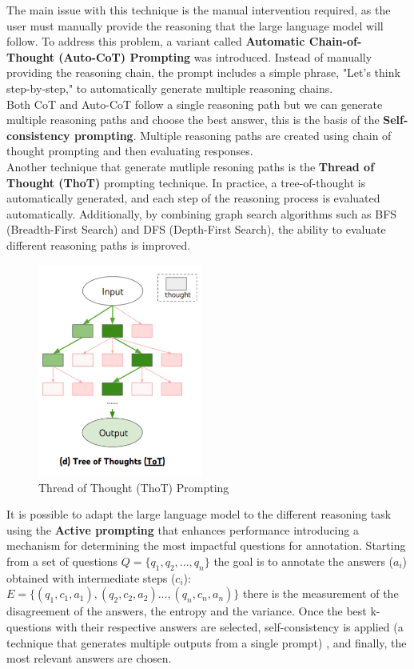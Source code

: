 The main issue with this technique is the manual intervention required, as the user must manually provide the reasoning that the large language model will follow. To address this problem, a variant called \textbf{Automatic Chain-of-Thought (Auto-CoT) Prompting} was introduced. Instead of manually providing the reasoning chain, the prompt includes a simple phrase, "Let's think step-by-step," to automatically generate multiple reasoning chains.\\
Both CoT and Auto-CoT follow a single reasoning path but we can generate multiple reasoning paths and choose the best answer, this is the basis of the \textbf{Self-consistency prompting}\cite{wang2022self}. Multiple reasoning paths are created using chain of thought prompting and then evaluating responses.\\
Another technique that generate mutliple resoning paths is the \textbf{Thread of Thought (ThoT)}
prompting technique. In practice, a tree-of-thought is automatically generated, and each step of the reasoning process is evaluated automatically. Additionally, by combining graph search algorithms such as BFS (Breadth-First Search) and DFS (Depth-First Search), the ability to evaluate different reasoning paths is improved.
\begin{figure}[H]
    \centering
    \includegraphics[width=0.4\linewidth, height=7cm]{Figures/fig_6.png}
    \caption{Thread of Thought (ThoT) Prompting}
    \label{fig:enter-label}
\end{figure}
It is possible to adapt the large language model to the different reasoning task using the \textbf{Active prompting} that enhances performance introducing a mechanism for determining the most impactful questions for annotation. Starting from a set of questions $Q = \{q_1, q_2, ..., q_n\}$ the goal is to annotate the answers ($a_i$) obtained with intermediate steps ($c_i$):\\ $E = \{(q_1, c_1, a_1), (q_2, c_2, a_2) ..., (q_n, c_n, a_n)\}$ there is the measurement of the disagreement of the answers, the entropy and the variance. Once the best k-questions with their respective answers are selected, self-consistency is applied (a technique that generates multiple outputs from a single prompt) \cite{wang2022self}, and finally, the most relevant answers are chosen.\\
